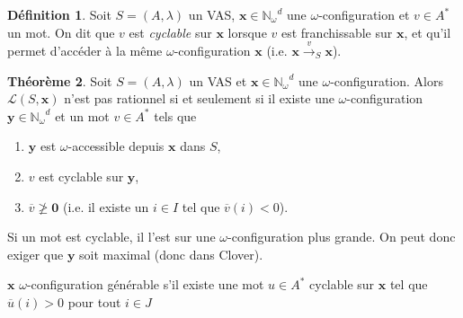 \documentclass[a4paper,final]{article}
\theoremstyle{definition}
\newtheorem{Theorem}{Théorème}
\newtheorem{Definition}[Theorem]{Définition}
\let\geq\geqslant
\newcommand{\eqfin}{\ensuremath{=_\text{fin}}}
\newcommand{\N}{\ensuremath{\mathbb{N}}}
\newcommand{\Nomega}{\ensuremath{\mathbb{N}_\omega}}
\newcommand{\lang}{\ensuremath{\mathcal{L}}}
\newcommand{\trans}[2]{\ensuremath{\stackrel{#1}{\longrightarrow}_{#2}}}
\newcommand{\vect}[1]{\ensuremath{\mathbf{#1}}}
\newcommand{\valeur}[1]{\ensuremath{\overline{#1}}}
\newcommand{\Jinf}[1]{J^\text{inf}_#1}
\begin{document}

\begin{Definition}
Soit $S = (A,\lambda)$ un VAS, $\vect{x}\in\Nomega^d$ une $\omega$-configuration et $v\in A^*$ un mot.
On dit que $v$ est \emph{cyclable} sur $\vect{x}$ lorsque $v$ est franchissable sur $\vect{x}$, et qu'il permet d'accéder à la même $\omega$-configuration $\vect{x}$ (i.e. $\vect{x} \trans{v}{S} \vect{x}$).
\end{Definition}

\begin{Theorem}
Soit $S = (A,\lambda)$ un VAS et $\vect{x}\in\Nomega^d$ une $\omega$-configuration.
Alors $\lang(S,\vect{x})$ n'est pas rationnel si et seulement si
il existe une $\omega$-configuration $\vect{y}\in\Nomega^d$ et un mot $v\in A^*$ tels que
\begin{enumerate}
    \item $\vect{y}$ est $\omega$-accessible depuis $\vect{x}$ dans $S$,
    \item $v$ est cyclable sur $\vect{y}$,
    \item $\valeur{v} \not\geq \vect{0}$ (i.e. il existe un $i\in I$ tel que $\valeur{v}(i)<0$).
\end{enumerate}
\end{Theorem}


Si un mot est cyclable, il l'est sur une $\omega$-configuration plus grande.
On peut donc exiger que $\vect{y}$ soit maximal (donc dans Clover).

$\vect{x}$ $\omega$-configuration générable s'il existe une mot $u\in A^*$ cyclable sur $\vect{x}$ tel que $\valeur{u}(i) > 0$ pour tout $i\in J$ %

\end{document}
